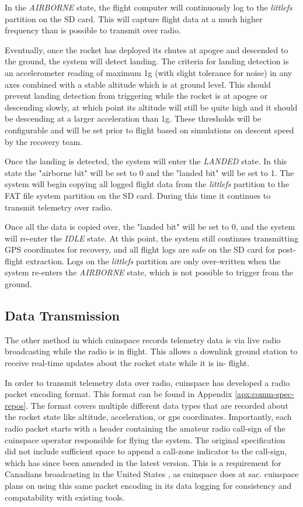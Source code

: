 In the \textit{AIRBORNE} state, the flight computer will continuously log to the \textit{littlefs} partition on the SD
card. This will capture flight data at a much higher frequency than is possible to transmit over radio.

Eventually, once the rocket has deployed its chutes at apogee and descended to the ground, the system will detect
landing. The criteria for landing detection is an accelerometer reading of maximum 1g (with slight tolerance for noise)
in any axes combined with a stable altitude which is at ground level. This should prevent landing detection from
triggering while the rocket is at apogee or descending slowly, at which point its altitude will still be quite high and
it should be descending at a larger acceleration than 1g. These thresholds will be configurable and will be set prior
to flight based on simulations on descent speed by the recovery team.

Once the landing is detected, the system will enter the \textit{LANDED} state. In this state the "airborne bit" will be
set to 0 and the "landed bit" will be set to 1. The system will begin copying all logged flight data from the
\textit{littlefs} partition to the FAT file system partition on the SD card. During this time it continues to transmit
telemetry over radio.

Once all the data is copied over, the "landed bit" will be set to 0, and the system will re-enter the \textit{IDLE}
state. At this point, the system still continues transmitting GPS coordinates for recovery, and all flight logs are
safe on the SD card for post-flight extraction. Logs on the \textit{littlefs} partition are only over-written when the
system re-enters the \textit{AIRBORNE} state, which is not possible to trigger from the ground.

\subsection{Data Transmission}

The other method in which \gls{cuinspace} records telemetry data is via live radio broadcasting while the radio is in
flight. This allows a downlink ground station to receive real-time updates about the rocket state while it is in-
flight.

In order to transmit telemetry data over radio, \gls{cuinspace} has developed a radio packet encoding format. This
format can be found in Appendix \ref{apx:comm-spec-repos}. The format covers multiple different data types that are
recorded about the rocket state like altitude, acceleration, or \gls{gps} coordinates. \cite{radio-comms}
Importantly, each radio packet starts with a header containing the amateur radio call-sign of the \gls{cuinspace}
operator responsible for flying the system. \cite{radio-comms} The original specification did not include sufficient
space to append a call-zone indicator to the call-sign, which has since been amended in the latest version. This is a
requirement for Canadians broadcasting in the United States \cite{foreign-broadcast}, as \gls{cuinspace} does at
\gls{sac}. \gls{cuinspace} plans on using this same packet encoding in its data logging for consistency and compatability
with existing tools.


